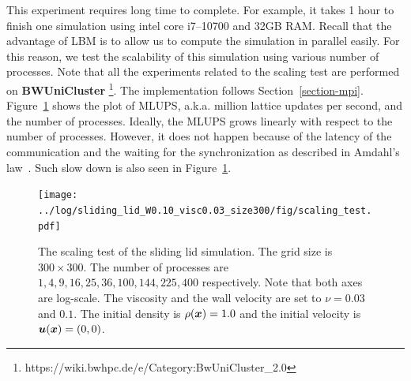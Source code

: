 This experiment requires long time to complete.
For example, it takes 1 hour to finish one simulation using
intel core i7--10700 and 32GB RAM.
Recall that the advantage of LBM is to allow us to compute the simulation in
parallel easily.
For this reason, we test the scalability of this simulation using
various number of processes.
Note that all the experiments related to the scaling test
are performed on {\bf BWUniCluster}
\footnote{https://wiki.bwhpc.de/e/Category:BwUniCluster\_2.0}.
The implementation follows Section~\ref{section-mpi}.
Figure~\ref{fig:sliding-lid-scaling} shows the plot of
MLUPS, a.k.a. million lattice updates per second, and
the number of processes.
Ideally, the MLUPS grows linearly with respect to the number of processes.
However, it does not happen because of the latency of the communication
and the waiting for the synchronization as described in Amdahl's law~\cite{amdahl1967validity}.
Such slow down is also seen in Figure~\ref{fig:sliding-lid-scaling}.
\begin{figure}[b]
  \centering
  \texttt{[image: ../log/sliding\_lid\_W0.10\_visc0.03\_size300/fig/scaling\_test.pdf]}
  \caption{The scaling test of the sliding lid simulation.
  The grid size is $300 \times 300$.
  The number of processes are $1 ,4 ,9 ,16 ,25 ,36 ,100 ,144 ,225 ,400$ respectively.
  Note that both axes are log-scale.
    The viscosity and the wall velocity are set to $\nu = 0.03$ and $0.1$.
    The initial density is $\rho(\boldsymbol{x}) = 1.0$ and the initial velocity is $\boldsymbol{u}(\boldsymbol{x}) = (0, 0)$.
  }
  \label{fig:sliding-lid-scaling}
\end{figure}

